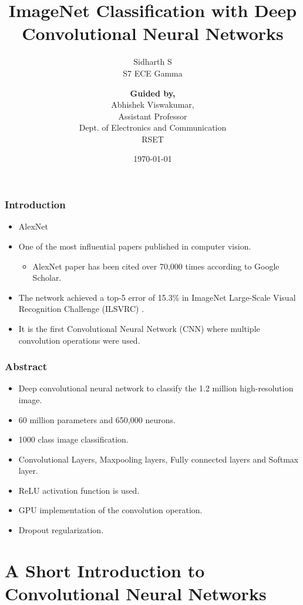 \documentclass[aspectratio=169, 10pt]{beamer}
\title{ImageNet Classification with Deep Convolutional
Neural Networks}
\author{
\vspace{5pt}
\textbf{Guided by,}\\
Abhishek Viswakumar,\\
Assistant Professor\\
Dept. of Electronics and Communication\\
RSET}
\subtitle{Sidharth S\\
S7 ECE Gamma}
\date{\today}
\institute{Rajagiri School of Engineering and Technology}
\begin{document}
\maketitle %


\begin{frame}
\frametitle{Introduction}
\begin{itemize}
\item AlexNet
\item One of the most influential papers published in computer vision.
	\begin{itemize}
	\item  AlexNet paper has been cited over 70,000 times according to Google Scholar.
	\end{itemize}
\item The network achieved a top-5 error of 15.3\% in ImageNet Large-Scale Visual Recognition Challenge
(ILSVRC) .
\item It is the first Convolutional Neural Network (CNN) where multiple convolution operations were used.
\end{itemize}


\end{frame}

\begin{frame}
	\frametitle{Abstract}
	\begin{itemize}
		\item Deep convolutional neural network to classify the 1.2 million
high-resolution image.
		\item 60 million parameters and 650,000 neurons.
		\item 1000 class image classification.
		\item Convolutional Layers, Maxpooling layers, Fully connected layers and Softmax layer.
		\item ReLU activation function is used.
		\item GPU implementation of the convolution operation.
		\item Dropout regularization.
	\end{itemize}

\end{frame}

\section{A Short Introduction to Convolutional Neural Networks}
\end{document}
